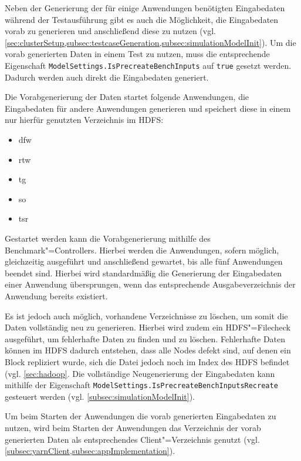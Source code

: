 Neben der Generierung der für einige Anwendungen benötigten Eingabedaten während der Testausführung gibt es auch die Möglichkeit, die Eingabedaten vorab zu generieren und anschließend diese zu nutzen (vgl. \cref{sec:clusterSetup,subsec:testcaseGeneration,subsec:simulationModelInit}).
Um die vorab generierten Daten in einem Test zu nutzen, muss die entsprechende Eigenschaft \texttt{ModelSettings.IsPrecreateBenchInputs} auf \texttt{true} gesetzt werden.
Dadurch werden auch direkt die Eingabedaten generiert.

Die Vorabgenerierung der Daten startet folgende Anwendungen, die Eingabedaten für andere Anwendungen generieren und speichert diese in einem nur hierfür genutzten Verzeichnis im HDFS:

\begin{itemize}
    \item \acrlong{dfw}
    \item \acrlong{rtw}
    \item \acrlong{tg}
    \item \acrlong{so}
    \item \acrlong{tsr}
\end{itemize}

Gestartet werden kann die Vorabgenerierung mithilfe des Benchmark"=Controllers.
Hierbei werden die Anwendungen, sofern möglich, gleichzeitig ausgeführt und anschließend gewartet, bis alle fünf Anwendungen beendet sind.
Hierbei wird standardmäßig die Generierung der Eingabedaten einer Anwendung übersprungen, wenn das entsprechende Ausgabeverzeichnis der Anwendung bereits existiert.

Es ist jedoch auch möglich, vorhandene Verzeichnisse zu löschen, um somit die Daten vollständig neu zu generieren.
Hierbei wird zudem ein HDFS"=Filecheck ausgeführt, um fehlerhafte Daten zu finden und zu löschen.
Fehlerhafte Daten können im HDFS \zB dadurch entstehen, dass alle Nodes defekt sind, auf denen ein Block repliziert wurde, sich die Datei jedoch noch im Index des HDFS befindet (vgl. \cref{sec:hadoop}.
Die vollständige Neugenerierung der Eingabedaten kann mithilfe der Eigenschaft \texttt{ModelSettings.IsPrecreateBenchInputsRecreate} gesteuert werden (vgl. \cref{subsec:simulationModelInit}).

Um beim Starten der Anwendungen die vorab generierten Eingabedaten zu nutzen, wird beim Starten der Anwendungen das Verzeichnis der vorab generierten Daten als entsprechendes Client"=Verzeichnis genutzt (vgl. \cref{subsec:yarnClient,subsec:appImplementation}).
